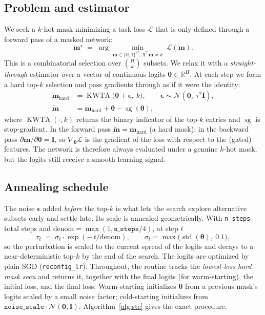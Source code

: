 \documentclass[11pt]{article}
\newcommand{\R}{\mathbb{R}}
\newcommand{\mask}{\bm{m}}                 %
\newcommand{\masksoft}{\tilde{\bm{m}}}     %
\newcommand{\Ho}{H}                        %
\newcommand{\kk}{k}                        %
\newcommand{\kwta}{\operatorname{KWTA}}
\newcommand{\code}[1]{\texttt{\small #1}}
\begin{document}
\subsection{Problem and estimator}

We seek a $\kk$-hot mask minimizing a task loss $\mathcal{L}$ that is only defined
through a forward pass of a masked network:
\[
\mask^\star \;=\; \arg\min_{\mask\in\{0,1\}^{\Ho},\ \bm 1^\top\mask=\kk}\ \mathcal{L}(\mask).
\]
This is a combinatorial selection over $\binom{\Ho}{\kk}$ subsets. We relax it with
a \emph{straight-through} estimator over a vector of continuous logits
$\bm\theta\in\R^{\Ho}$. At each step we form a hard top-$k$ selection and pass
gradients through as if it were the identity:
\begin{align}
\mask_{\mathrm{hard}} &= \kwta\!\bigl(\bm\theta + \bm\epsilon,\ \kk\bigr), \qquad \bm\epsilon\sim\mathcal N(\bm 0,\ \tau^2 \bm I),\\
\masksoft &= \mask_{\mathrm{hard}} + \bm\theta - \operatorname{sg}(\bm\theta),
\label{eq:ste}
\end{align}
where $\kwta(\cdot,\kk)$ returns the binary indicator of the top-$\kk$ entries and
$\operatorname{sg}$ is stop-gradient. In the forward pass $\masksoft =
\mask_{\mathrm{hard}}$ (a hard mask); in the backward pass
$\partial\masksoft/\partial\bm\theta = \bm I$, so $\nabla_{\bm\theta}\mathcal{L}$
is the gradient of the loss with respect to the (gated) features. The network is
therefore always evaluated under a genuine $\kk$-hot mask, but the logits still
receive a smooth learning signal.

\subsection{Annealing schedule}

The noise $\bm\epsilon$ added \emph{before} the top-$k$ is what lets the search
explore alternative subsets early and settle late. Its scale is annealed
geometrically. With \code{n\_steps} total steps and $\text{denom}=\max(1,
\texttt{n\_steps}/4)$, at step $t$
\[
\tau_t \;=\; \sigma_t \cdot \exp\!\left(-\,t/\text{denom}\right),\qquad
\sigma_t = \max\bigl(\operatorname{std}(\bm\theta),\ 0.1\bigr),
\]
so the perturbation is scaled to the current spread of the logits and decays to a
near-deterministic top-$k$ by the end of the search. The logits are optimized by
plain SGD (\code{reconfig\_lr}). Throughout, the routine tracks the
\emph{lowest-loss hard mask seen} and returns it, together with the final logits
(for warm-starting), the initial loss, and the final loss. Warm-starting
initializes $\bm\theta$ from a previous mask's logits scaled by a small noise
factor; cold-starting initializes from $\texttt{noise\_scale}\cdot\mathcal
N(\bm 0,\bm I)$. Algorithm~\ref{alg:ste} gives the exact procedure.
\end{document}
